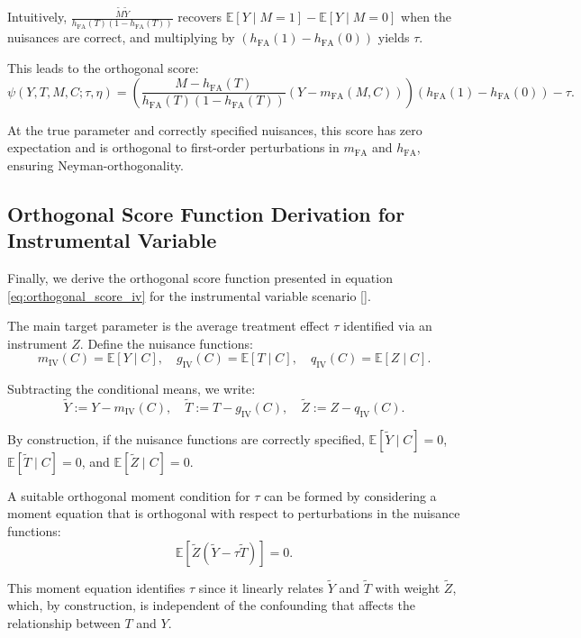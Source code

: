 \documentclass{article}
\numberwithin{equation}{section}
\begin{document}
Intuitively, \(\frac{\tilde{M}\tilde{Y}}{h_{\text{FA}}(T)(1-h_{\text{FA}}(T))}\) recovers \(\mathbb{E}[Y \mid M=1]-\mathbb{E}[Y \mid M=0]\) when the nuisances are correct, and multiplying by \((h_{\text{FA}}(1)-h_{\text{FA}}(0))\) yields \(\tau\).

This leads to the orthogonal score:
\[
\psi(Y, T, M, C; \tau, \eta) 
= \left(\frac{M - h_{\text{FA}}(T)}{h_{\text{FA}}(T)(1 - h_{\text{FA}}(T))}(Y - m_{\text{FA}}(M, C))\right)(h_{\text{FA}}(1) - h_{\text{FA}}(0)) - \tau.
\]

At the true parameter and correctly specified nuisances, this score has zero expectation and is orthogonal to first-order perturbations in \(m_{\text{FA}}\) and \(h_{\text{FA}}\), ensuring Neyman-orthogonality.

\newpage
\subsection{Orthogonal Score Function Derivation for Instrumental Variable}
\label{subsec:appendix_orthogonal_score_function_instrumental_variable}

Finally, we derive the orthogonal score function presented in equation \eqref{eq:orthogonal_score_iv} for the instrumental variable scenario [\cite{BelloniChernozhukovHansen2014, ChernozhukovChetverikovDemireretal2018, Pearl2009}].

The main target parameter is the average treatment effect \(\tau\) identified via an instrument \(Z\). Define the nuisance functions:
\[
m_{\text{IV}}(C) = \mathbb{E}[Y \mid C], \quad
g_{\text{IV}}(C) = \mathbb{E}[T \mid C], \quad
q_{\text{IV}}(C) = \mathbb{E}[Z \mid C].
\]

Subtracting the conditional means, we write:
\[
\tilde{Y} := Y - m_{\text{IV}}(C), \quad
\tilde{T} := T - g_{\text{IV}}(C), \quad
\tilde{Z} := Z - q_{\text{IV}}(C).
\]

By construction, if the nuisance functions are correctly specified, \(\mathbb{E}[\tilde{Y} \mid C] = 0\), \(\mathbb{E}[\tilde{T} \mid C] = 0\), and \(\mathbb{E}[\tilde{Z} \mid C] = 0\).

A suitable orthogonal moment condition for \(\tau\) can be formed by considering a moment equation that is orthogonal with respect to perturbations in the nuisance functions:
\[
\mathbb{E}[\tilde{Z}(\tilde{Y} - \tau \tilde{T})] = 0.
\]

This moment equation identifies \(\tau\) since it linearly relates \(\tilde{Y}\) and \(\tilde{T}\) with weight \(\tilde{Z}\), which, by construction, is independent of the confounding that affects the relationship between \(T\) and \(Y\).
\end{document}
